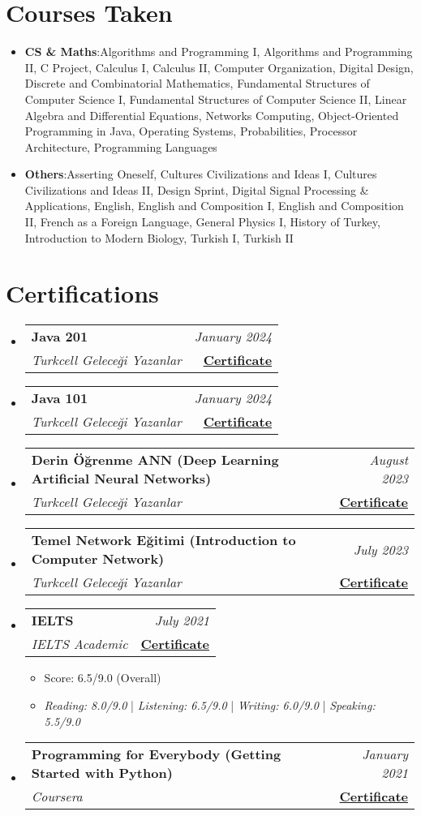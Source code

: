 \documentclass[a4paper,11pt]{article}
\makeatletter
\newcommand{\resumeItem}[2]{
    \item{\textbf{#1}{:\hspace{0.5mm}#2 \vspace{-0.5mm}}}
}
\newcommand{\resumeSubheading}[4]{
\vspace{0.5mm}\item
    \begin{tabular*}{0.98\textwidth}[t]{l@{\extracolsep{\fill}}r}
    \textbf{#1} & \textit{\footnotesize{#4}} \\
    \textit{\footnotesize{#3}} &  \footnotesize{#2} \\
    \end{tabular*}\vspace{-2.4mm}
}
\newcommand{\resumeSubItem}[2]{\resumeItem{#1}{#2}\vspace{-4pt}}
\newcommand{\resumeSubHeadingListStart}{\begin{itemize}[leftmargin=*,labelsep=0mm]}
\newcommand{\resumeHeadingSkillStart}{\begin{itemize}[leftmargin=*,itemsep=1.7mm, rightmargin=2ex]}
\newcommand{\resumeItemListStart}{\begin{justify}\begin{itemize}[leftmargin=3ex, rightmargin=2ex, noitemsep,labelsep=1.2mm,itemsep=0mm]\small}
\newcommand{\resumeSubHeadingListEnd}{\end{itemize}\vspace{2mm}}
\newcommand{\resumeHeadingSkillEnd}{\end{itemize}\vspace{-2mm}}
\newcommand{\resumeItemListEnd}{\end{itemize}\end{justify}\vspace{-2mm}}
\makeatother
\begin{document}
\section{\textbf{Courses Taken}}
\resumeHeadingSkillStart
    \resumeSubItem{CS \& Maths}
        {Algorithms and Programming I, Algorithms and Programming II, C Project, Calculus I, Calculus II, Computer Organization, Digital Design, Discrete and Combinatorial Mathematics, Fundamental Structures of Computer Science I, Fundamental Structures of Computer Science II, Linear Algebra and Differential Equations, Networks Computing, Object-Oriented Programming in Java, Operating Systems, Probabilities, Processor Architecture, Programming Languages}
    \resumeSubItem{Others}
        {Asserting Oneself, Cultures Civilizations and Ideas I, Cultures Civilizations and Ideas II, Design Sprint, Digital Signal Processing \& Applications, English, English and Composition I, English and Composition II, French as a Foreign Language, General Physics I, History of Turkey, Introduction to Modern Biology, Turkish I, Turkish II}
\resumeHeadingSkillEnd
\vspace{-1mm}


\section{\textbf{Certifications}}
    \resumeSubHeadingListStart
        \resumeSubheading
            {Java 201}{\href{https://drive.google.com/file/d/1vD8vmiyYwKvS5aYOlA2uqjPI9n-wBM9T/view}{\textbf{\color{blue}Certificate}}}
            {Turkcell Geleceği Yazanlar}{January 2024}
        \resumeSubheading
            {Java 101}{\href{https://drive.google.com/file/d/1zdZCYs2E5Qpped_xJRrILFj2uN1enebY/view}{\textbf{\color{blue}Certificate}}}
            {Turkcell Geleceği Yazanlar}{January 2024}
        \resumeSubheading
            {Derin Öğrenme ANN (Deep Learning Artificial Neural Networks)}{\href{https://drive.google.com/file/d/1c3lkospGb5_XNwzyL9Z_lm4VM06TJs1d/view}{\textbf{\color{blue}Certificate}}}
            {Turkcell Geleceği Yazanlar}{August 2023}
        \resumeSubheading
            {Temel Network Eğitimi (Introduction to Computer Network)}{\href{https://drive.google.com/file/d/16RW97XUNj9QyksCpjlbETMRPHho53KJg/view}{\textbf{\color{blue}Certificate}}}
            {Turkcell Geleceği Yazanlar}{July 2023}
        \resumeSubheading
            {IELTS}{\href{https://drive.google.com/file/d/1jKMRSpP3VZ0Qj-F9RZ2jfN7uosiKkEt6/view}{\textbf{\color{blue}Certificate}}}
            {IELTS Academic}{July 2021}
                \resumeItemListStart
                    \item {Score: 6.5/9.0 (Overall)}
                    \item {\emph{Reading: 8.0/9.0} | \emph{Listening: 6.5/9.0} | \emph{Writing: 6.0/9.0} | \emph{Speaking: 5.5/9.0} }
                \resumeItemListEnd
        \resumeSubheading
            {Programming for Everybody (Getting Started with Python)}{\href{https://www.coursera.org/account/accomplishments/certificate/6EU4LEV48RQX}{\textbf{\color{blue}Certificate}}}
            {Coursera}{January 2021}
    \resumeSubHeadingListEnd
\vspace{-5.5mm}


\vfill
{}
\end{document}
